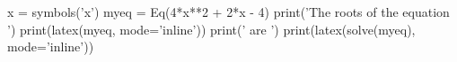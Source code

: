 \documentclass[a4paper,11pt]{article}
\begin{document}
\begin{sympycode}
x = symbols('x')
myeq = Eq(4*x**2 + 2*x - 4)
print('The roots of the equation ')
print(latex(myeq, mode='inline'))
print(' are ')
print(latex(solve(myeq), mode='inline'))
\end{sympycode}
\end{document}
